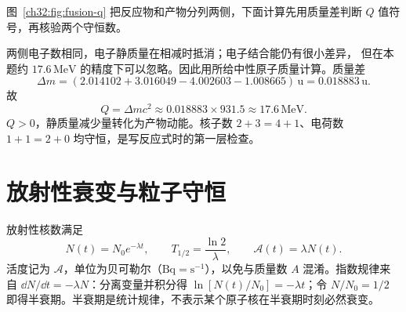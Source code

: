 \begin{xesolution}
\begin{center}\begin{minipage}{\linewidth}\centering\raggedright\ModernAnswerLabel\par\smallskip\centering

\end{minipage}\end{center}
图~\ref{ch32:fig:fusion-q} 把反应物和产物分列两侧，下面计算先用质量差判断 $Q$ 值符号，再核验两个守恒数。


两侧电子数相同，电子静质量在相减时抵消；电子结合能仍有很小差异，
但在本题约 $17.6\,\mathrm{MeV}$ 的精度下可以忽略。因此用所给中性原子质量计算。质量差
\[
 \Delta m=(2.014102+3.016049-4.002603-1.008665)\,\mathrm u
 =0.018883\,\mathrm u.
\]
故
\[
 \boxed{Q=\Delta mc^2\approx0.018883\times931.5
 \approx17.6\,\mathrm{MeV}}.
\]
$Q>0$，静质量减少量转化为产物动能。核子数 $2+3=4+1$、电荷数 $1+1=2+0$ 均守恒，是写反应式时的第一层检查。
\end{xesolution}



\section{放射性衰变与粒子守恒}

放射性核数满足
\begin{equation}
 N(t)=N_0e^{-\lambda t},\qquad
 T_{1/2}=\frac{\ln2}{\lambda},\qquad
 \mathcal A(t)=\lambda N(t).
\end{equation}
活度记为 $\mathcal A$，单位为贝可勒尔（$\mathrm{Bq}=\mathrm{s^{-1}}$），以免与质量数 $A$ 混淆。指数规律来自 $\dd N/\dd t=-\lambda N$：分离变量并积分得 $\ln[N(t)/N_0]=-\lambda t$；令 $N/N_0=1/2$ 即得半衰期。半衰期是统计规律，不表示某个原子核在半衰期时刻必然衰变。


